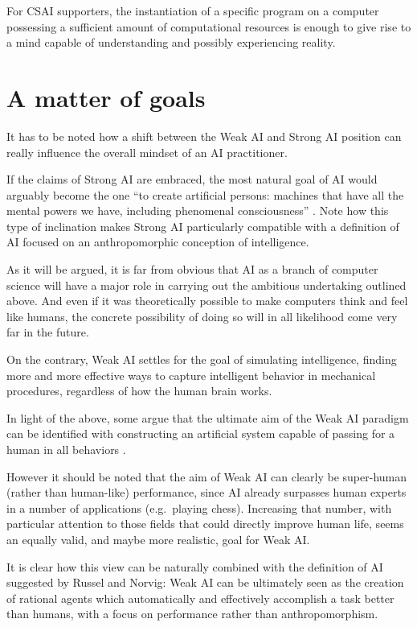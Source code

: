 \documentclass{article}
\begin{document}
For CSAI supporters, the instantiation of a specific program on a computer possessing a sufficient amount of computational resources is enough to give rise to a mind capable of understanding and possibly experiencing reality.

\section{A matter of goals}

It has to be noted how a shift between the Weak AI and Strong AI position can really influence the overall mindset of an AI practitioner.

If the claims of Strong AI are embraced, the most natural goal of AI would arguably become the one ``to create artificial persons: machines that have all the mental powers we have, including phenomenal consciousness'' \citep[8.1]{sep-artificial-intelligence}. Note how this type of inclination makes Strong AI particularly compatible with a definition of AI focused on an anthropomorphic conception of intelligence.

As it will be argued, it is far from obvious that AI as a branch of computer science will have a major role in carrying out the ambitious undertaking outlined above. And even if it was theoretically possible to make computers think and feel like humans, the concrete possibility of doing so will in all likelihood come very far in the future.

On the contrary, Weak AI settles for the goal of simulating intelligence, finding more and more effective ways to capture intelligent behavior in mechanical procedures, regardless of how the human brain works.

In light of the above, some argue that the ultimate aim of the Weak AI paradigm can be identified with constructing an artificial system capable of passing for a human in all behaviors \citep{sep-artificial-intelligence}.

However it should be noted that the aim of Weak AI can clearly be super-human (rather than human-like) performance, since AI already surpasses human experts in a number of applications (e.g.~playing chess). Increasing that number, with particular attention to those fields that could directly improve human life, seems an equally valid, and maybe more realistic, goal for Weak AI.

It is clear how this view can be naturally combined with the definition of AI suggested by Russel and Norvig: Weak AI can be ultimately seen as the creation of rational agents which automatically and effectively accomplish a task better than humans, with a focus on performance rather than anthropomorphism.
\end{document}
